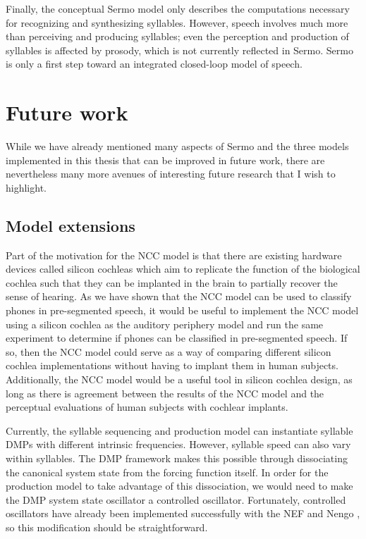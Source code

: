 Finally, the conceptual Sermo model
only describes the computations necessary
for recognizing and synthesizing syllables.
However, speech involves much more
than perceiving and producing syllables;
even the perception and production of syllables
is affected by prosody,
which is not currently reflected in Sermo.
Sermo is only a first step toward
an integrated closed-loop model
of speech.

\section{Future work}

While we have already mentioned many
aspects of Sermo and the three models
implemented in this thesis
that can be improved in future work,
there are nevertheless many more
avenues of interesting future research
that I wish to highlight.

\subsection{Model extensions}

Part of the motivation for the NCC model
is that there are existing hardware devices
called silicon cochleas
which aim to replicate the function
of the biological cochlea
such that they can be implanted
in the brain to partially recover the sense of hearing.
As we have shown that the NCC model
can be used to classify phones
in pre-segmented speech,
it would be useful to
implement the NCC model using
a silicon cochlea
as the auditory periphery model
and run the same experiment
to determine if phones can be classified
in pre-segmented speech.
If so, then the NCC model could serve
as a way of comparing different
silicon cochlea implementations
without having to implant them
in human subjects.
Additionally, the NCC model
would be a useful tool in silicon cochlea design,
as long as there is agreement
between the results of the NCC model
and the perceptual evaluations
of human subjects
with cochlear implants.

Currently, the syllable sequencing and production model
can instantiate syllable DMPs with different
intrinsic frequencies.
However, syllable speed can also vary within syllables.
The DMP framework makes this possible through
dissociating the canonical system state
from the forcing function itself.
In order for the production model to take advantage
of this dissociation,
we would need to make the DMP system state oscillator
a controlled oscillator.
Fortunately, controlled oscillators
have already been implemented successfully
with the NEF and Nengo \citep{bekolay2013},
so this modification should be straightforward.

